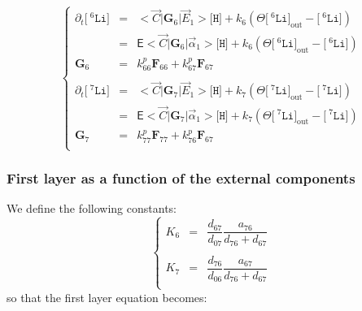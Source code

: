 \documentclass[aps,onecolumn,11pt]{revtex4}
\newcommand{\mychem}[1]{\mathtt{#1}}
\newcommand{\myconc}[1]{\big[#1\big]}
\newcommand{\spLi}[1]{{\!~^{#1}\mychem{Li}}}
\newcommand{\Li}[1]{\myconc{\spLi{#1}}}
\newcommand{\spproton}{\mychem{H}}
\newcommand{\proton}{\myconc{\spproton}}
\newcommand{\myout}[1]{{#1}_{\mathrm{out}}}
\newcommand{\LiOut}[1]{\myout{\Li{#1}}}
\newcommand{\mymat}[1]{{\bm{#1}}}
\begin{document}
\begin{equation}
\left\lbrace
\begin{array}{rcl}
	\partial_t \Li{6} & = & <\vec{C}|\mymat{G}_6|\vec{E}_1> \proton+ k_6\left(\Theta \LiOut{6} - \Li{6}\right)\\
	& = & \mathsf{E} <\vec{C}|\mymat{G}_6|\vec{\alpha}_1> \proton+ k_6\left(\Theta \LiOut{6} - \Li{6}\right)\\
	\mymat{G}_6 &= & k^p_{66} \mymat{F}_{66} + k^p_{67}\mymat{F}_{67} 
	\\
	\\
	\partial_t \Li{7} & = & <\vec{C}|\mymat{G}_7|\vec{E}_1> \proton + k_7\left(\Theta \LiOut{7} - \Li{7}\right)\\
		& = & \mathsf{E} <\vec{C}|\mymat{G}_7|\vec{\alpha}_1> \proton+ k_7\left(\Theta \LiOut{7} - \Li{7}\right)\\
	\mymat{G}_7 & = & k^p_{77} \mymat{F}_{77} + k^p_{76}\mymat{F}_{67} 
	\\
\end{array}
\right.
\end{equation}


\subsubsection{First layer as a function of the external components}
We define the following constants:
\begin{equation}
\left\lbrace
\begin{array}{rcl}
K_6 & = & \dfrac{d_{67}}{d_{07}}\dfrac{a_{76}}{d_{76}+d_{67}} \\
\\
K_7 & = &  \dfrac{d_{76}}{d_{06}}\dfrac{a_{67}}{d_{76}+d_{67}}\\
\end{array}
\right.
\end{equation}
so that the first layer equation becomes:
	
\end{document}

